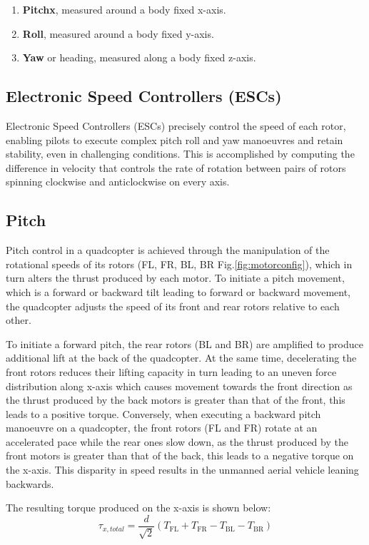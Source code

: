 \documentclass{report}
\begin{document}
\begin{enumerate}
  \item \textbf{Pitchx}, measured around a body fixed x-axis.
  \item \textbf{Roll}, measured around a body fixed y-axis.
  \item \textbf{Yaw} or heading, measured along a body fixed z-axis.
\end{enumerate}

\subsection{Electronic Speed Controllers (ESCs)}
Electronic Speed Controllers (ESCs) precisely control the speed of each rotor,
enabling pilots to execute complex pitch roll and yaw manoeuvres and retain
stability, even in challenging conditions. This is accomplished by computing the
difference in velocity that controls the rate of rotation between pairs of
rotors spinning clockwise and anticlockwise on every axis.

\subsection{Pitch}
Pitch control in a quadcopter is achieved through the manipulation of the
rotational speeds of its rotors (FL, FR, BL, BR Fig.\ref{fig:motorconfig}),
which in turn alters the thrust produced by each motor. To initiate a pitch
movement, which is a forward or backward tilt leading to forward or backward
movement, the quadcopter adjusts the speed of its front and rear rotors relative
to each other. 

To initiate a forward pitch, the rear rotors (BL and BR) are amplified to
produce additional lift at the back of the quadcopter. At the same time,
decelerating the front rotors reduces their lifting capacity in turn leading to
an uneven force distribution along x-axis which causes movement towards the
front direction as the thrust produced by the back motors is greater than that
of the front, this leads to a positive torque. Conversely, when executing a
backward pitch manoeuvre on a quadcopter, the front rotors (FL and FR) rotate at
an accelerated pace while the rear ones slow down, as the thrust produced by the
front motors is greater than that of the back, this leads to a negative torque
on the x-axis. This disparity in speed results in the unmanned aerial vehicle
leaning backwards.

The resulting torque produced on the x-axis is shown below:
\begin{equation}
  \tau_{x, total} = \frac{d}{\sqrt{2}} (T_{\text{FL}} + T_{\text{FR}} - T_{\text{BL}} - T_{\text{BR}})
  \label{torque_x}
\end{equation}
\end{document}
